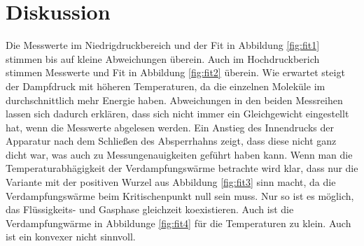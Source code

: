 \section{Diskussion}
\label{sec:Diskussion}
Die Messwerte im Niedrigdruckbereich und der Fit in Abbildung \ref{fig:fit1} stimmen bis auf kleine
Abweichungen überein. Auch im Hochdruckberich stimmen Messwerte und Fit in
Abbildung \ref{fig:fit2} überein. Wie erwartet steigt der Dampfdruck mit
höheren Temperaturen, da die einzelnen Moleküle im durchschnittlich mehr
Energie haben. Abweichungen in den beiden Messreihen lassen sich dadurch erklären,
dass sich nicht immer ein Gleichgewicht eingestellt hat, wenn die Messwerte 
abgelesen werden. Ein Anstieg des
Innendrucks der Apparatur nach dem Schließen des Absperrhahns zeigt, dass diese
nicht ganz dicht war, was auch zu Messungenauigkeiten geführt haben kann.  Wenn man die
Temperaturabhägigkeit der Verdampfungswärme betrachte wird klar, dass nur die
Variante mit der positiven Wurzel aus Abbildung \ref{fig:fit3} sinn macht, da
die Verdampfungswärme beim Kritischenpunkt null sein muss.  Nur so ist es möglich,
das Flüssigkeits- und Gasphase gleichzeit koexistieren. Auch ist die Verdampfungwärme
 in Abbildunge \ref{fig:fit4} für die Temperaturen zu klein. Auch ist ein konvexer
 nicht sinnvoll.
